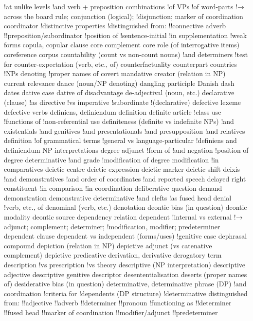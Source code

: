 !at unlike levels
!and verb + preposition combinations
!of VPs
!of word-parts
!→ across the board rule; conjunction (logical);
!disjunction; marker of coordination
coordinator
!distinctive properties
!distinguished from:
!!connective adverb
!!preposition/subordinator
!position of
!sentence-initial
!in supplementation
!weak forms
copula, copular clause
core complement
core role (of interrogative items)
coreference
corpus
countability (count vs non-count nouns)
!and determiners
!test for
counter-expectation (verb, etc., of)
counterfactuality
counterpart
countries
!NPs denoting
!proper names of
covert mandative
creator (relation in NP)
current relevance
dance (noun/NP denoting)
dangling participle
Danish
dash
dates
dative case
dative of disadvantage
de-adjectival (noun, etc.)
declarative (clause)
!as directive
!vs imperative
!subordinate
!(declarative)
defective lexeme
defective verbs
definiens, definiendum
definition
definite article
!class use
!functions of
!non-referential use
definiteness (definite vs indefinite NPs)
!and existentials
!and genitives
!and presentationals
!and presupposition
!and relatives
definition
!of grammatical terms
!general vs language-particular
!definiens and definiendum NP interpretations
degree adjunct
!form of
!and negation
!position of
degree determinative
!and grade
!modification of
degree modification
!in comparatives
deictic centre
deictic expression
deictic marker
deictic shift
deixis
!and demonstratives
!and order of coordinates
!and reported speech
delayed right constituent
!in comparison
!in coordination
deliberative question
demand
demonstration
demonstrative determinative
!and clefts
!as fused head
denial
!verb, etc., of
denominal (verb, etc.)
denotation
deontic bias (in question)
deontic modality
deontic source
dependency relation
dependent
!internal vs external
!→ adjunct; complement; determiner;
!modification, modifier; predeterminer
dependent clause
dependent vs independent (forms/uses)
!genitive case
dephrasal compound
depiction (relation in NP)
depictive adjunct (vs catenative complement)
depictive predicative
derivation, derivative
derogatory term
description
!vs prescription
!vs theory
descriptive (NP interpretation)
descriptive adjective
descriptive genitive
descriptor
desententialisation
deserts (proper names of)
desiderative bias (in question)
determinative, determinative phrase (DP)
!and coordination
!criteria for
!dependents (DP structure)
!determinative distinguished from:
!!adjective
!!adverb
!!determiner
!!pronoun
!functioning as
!!determiner
!!fused head
!!marker of coordination
!!modifier/adjunct
!!predeterminer

